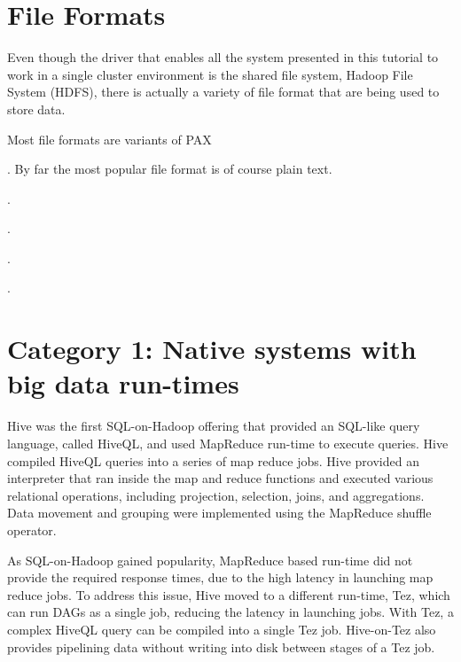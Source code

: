 \documentclass{vldb}
\begin{document}
\section{File Formats}

Even though the driver that enables all the system presented in this tutorial to work in a single cluster environment is the shared file system, Hadoop File System (HDFS), there is actually a variety of file format that are being used to store data. 

Most file formats are variants of PAX \cite{AilamakiDHS01}

. By far the most popular file format is of course plain text.

\vspace{2mm}
.

\vspace{2mm}
.

\vspace{2mm}
.

\vspace{2mm}
.

\section{Category 1: Native systems with big data run-times}

Hive \cite{hive} was the first SQL-on-Hadoop offering that provided an SQL-like query language, called HiveQL, and used MapReduce run-time to execute queries. Hive compiled HiveQL queries into a series of map reduce jobs. Hive provided an interpreter that ran inside the map and reduce functions and executed various relational operations, including projection, selection, joins, and aggregations. Data movement and grouping were implemented using the MapReduce shuffle operator.

As SQL-on-Hadoop gained popularity, MapReduce based run-time did not provide the required response times, due to the high latency in launching map reduce jobs. To address this issue, Hive moved to a different run-time, Tez, which can run DAGs as a single job, reducing the latency in launching jobs. With Tez, a complex HiveQL query can be compiled into a single Tez job. Hive-on-Tez also provides pipelining data without writing into disk between stages of a Tez job.
\end{document}
